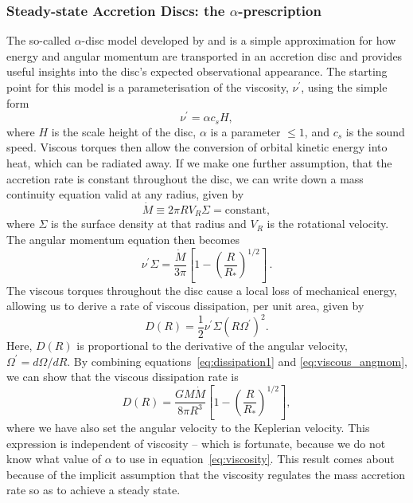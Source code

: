 \subsubsection{Steady-state Accretion Discs: the $\alpha$-prescription}

\label{sec:alpha_disc}

The so-called $\alpha$-disc model developed by 
\citet[][hereafter SS73]{shakurasunyaev1973} and \cite{lyndenbell1969} is
a simple approximation for how energy and angular momentum
are transported in an accretion disc and provides useful insights into
the disc's expected observational appearance. 
The starting point for this model is a parameterisation
of the viscosity, $\nu^\prime$, using the simple form
\begin{equation}
\nu^\prime = \alpha c_s H,
\label{eq:viscosity}
\end{equation}
where $H$ is the scale height of the disc,
$\alpha$ is a parameter $\leq 1$, and $c_s$ is the sound speed.
Viscous torques then allow the conversion of orbital kinetic energy into heat, 
which can be radiated away. 
If we make one further assumption, that the accretion rate is
constant throughout the disc, we can write down a mass continuity equation
valid at any radius, given by
\begin{equation}
\dot{M} \equiv 2 \pi R V_R \Sigma = \mathrm{constant},
\end{equation}
where $\Sigma$ is the surface density at that radius and $V_R$ is the rotational
velocity. The angular momentum equation then becomes
\begin{equation}
\nu^\prime \Sigma = \frac{\dot{M}}{3 \pi} \left[1 - \left( \frac{R}{R_*} \right)^{1/2} \right]\, .
\label{eq:viscous_angmom}
\end{equation}
The viscous torques throughout the disc cause a local loss of mechanical energy, allowing 
us to derive \citep[see, e.g.][]{fkrbook} a rate of viscous dissipation, 
per unit area, given by
\begin{equation}
D(R) = \frac{1}{2} \nu^\prime \Sigma (R \Omega^\prime)^2.
\label{eq:dissipation1}
\end{equation}
Here, $D(R)$ is proportional to the derivative of the angular velocity, $\Omega^\prime=d\Omega/dR$.
By combining equations~\ref{eq:dissipation1} and \ref{eq:viscous_angmom}, we can show that the 
viscous dissipation rate is 
\begin{equation}
D(R) = \frac{G M \dot{M}}{8 \pi R^3} \left[1 - \left( \frac{R}{R_*} \right)^{1/2} \right],
\label{eq:dissipation2}
\end{equation}
where we have also set the angular velocity to the Keplerian velocity. 
This expression is independent of viscosity -- which is fortunate, because
we do not know what value of $\alpha$ to use in equation~\ref{eq:viscosity}.
This result comes about because of the implicit assumption that the viscosity regulates
the mass accretion rate so as to achieve a steady state.

